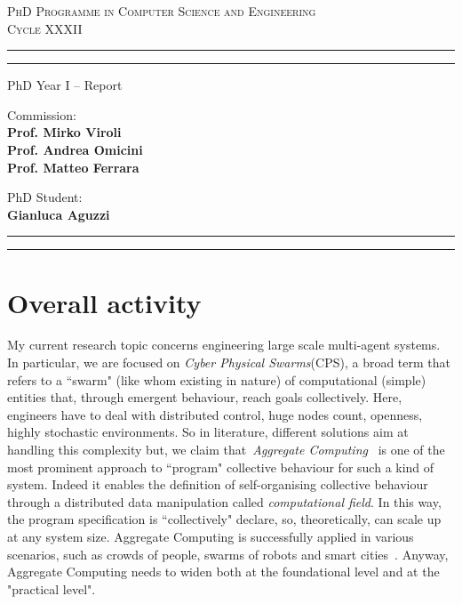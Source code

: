 \documentclass[12pt]{article}
\begin{document}
\begin{center}
	{{
		\Large{
			\textsc{PhD Programme in Computer Science and Engineering \\ Cycle XXXII}
			}
	}} 
	\rule[0.1cm]{\textwidth}{0.1mm}
	\rule[0.4cm]{\textwidth}{0.6mm}
\end{center}

\begin{center}
	\vspace{8mm}
	{\LARGE{PhD Year I -- Report}}
\end{center}
\vspace{8mm}
\par
\noindent
\begin{minipage}[t]{0.47\textwidth}

{\large{Commission: \\\bf
Prof. Mirko Viroli \\
Prof. Andrea Omicini \\
Prof. Matteo Ferrara} 
}
\end{minipage}
\hfill
\begin{minipage}[t]{0.47\textwidth}
	\raggedleft
	{
		\large{PhD Student: \\\bf Gianluca Aguzzi }
	}
\end{minipage}
\vspace{10mm}

{
	\raggedright
	\rule[0.1cm]{\textwidth}{0.6mm}
	\rule[0.5cm]{\textwidth}{0.1mm}
}

\section{Overall activity}
My current research topic concerns engineering large scale multi-agent systems. In particular, we are
 focused on \textit{Cyber Physical Swarms}(CPS), a broad term that refers to a ``swarm" (like whom
 existing in nature) of computational (simple) entities that, through emergent behaviour, reach goals collectively.  
%
Here, engineers have to deal with distributed control, huge nodes count, openness, highly stochastic environments.
%
So in literature, different solutions aim at handling this complexity but, we claim that~\textit{Aggregate Computing}~\cite{aggregatecomputing} is one of the most
 prominent approach to ``program" collective behaviour for such a kind of system.
%
Indeed it enables the definition of self-organising collective behaviour through a distributed data manipulation called \textit{computational field}. In this way, the program specification is ``collectively" declare, so, theoretically,
 can scale up at any system size.
%
Aggregate Computing is successfully applied in various scenarios, such as crowds of people, swarms of robots and smart cities~\cite{processes}.
%
Anyway, Aggregate Computing needs to widen both at the foundational level and at the "practical level".
\end{document}
